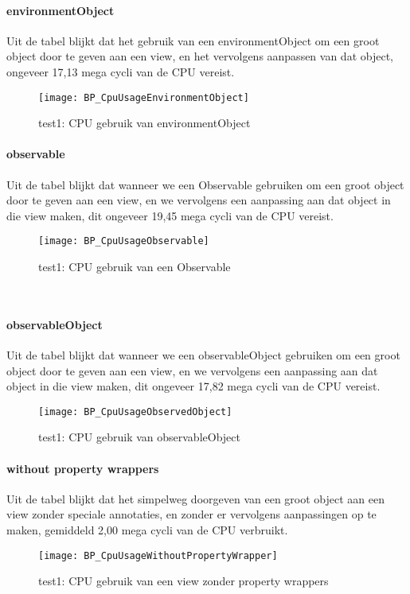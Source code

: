 \paragraph{environmentObject}
Uit de tabel blijkt dat het gebruik van een environmentObject om een groot object door te geven aan een view, en het vervolgens aanpassen van dat object, ongeveer 17,13 mega cycli van de CPU vereist.
\begin{figure}[H]
    \centering
    \texttt{[image: BP\_CpuUsageEnvironmentObject]} 
    \caption{test1: CPU gebruik van environmentObject}
    \label{fig:cpuEnvironmentObject}
\end{figure}

\paragraph{observable}
Uit de tabel blijkt dat wanneer we een Observable gebruiken om een groot object door te geven aan een view, en we vervolgens een aanpassing aan dat object in die view maken, dit ongeveer 19,45 mega cycli van de CPU vereist.
\begin{figure}[H]
    \centering
    \texttt{[image: BP\_CpuUsageObservable]} 
    \caption{test1: CPU gebruik van een Observable}
    \label{fig:cpuObservable}
\end{figure}\

\paragraph{observableObject}
Uit de tabel blijkt dat wanneer we een observableObject gebruiken om een groot object door te geven aan een view, en we vervolgens een aanpassing aan dat object in die view maken, dit ongeveer 17,82 mega cycli van de CPU vereist.
\begin{figure}[H]
    \centering
    \texttt{[image: BP\_CpuUsageObservedObject]} 
    \caption{test1: CPU gebruik van observableObject}
    \label{fig:cpuObservedObject}
\end{figure}

\paragraph{without property wrappers}
Uit de tabel blijkt dat het simpelweg doorgeven van een groot object aan een view zonder speciale annotaties, en zonder er vervolgens aanpassingen op te maken, gemiddeld 2,00 mega cycli van de CPU verbruikt.
\begin{figure}[H]
    \centering
    \texttt{[image: BP\_CpuUsageWithoutPropertyWrapper]} 
    \caption{test1: CPU gebruik van een view zonder property wrappers}
    \label{fig:cpuWithoutPropertyWrapper}
\end{figure}

